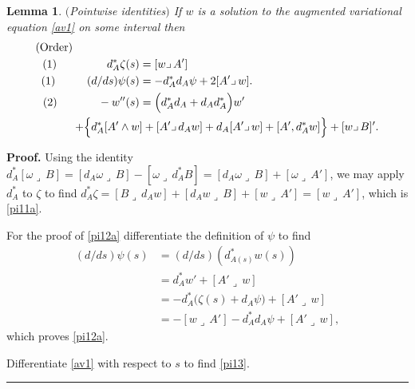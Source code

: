 \documentclass[12pt]{article}
\newtheorem{lemma}[theorem]{Lemma}
\newenvironment{proof}[1][Proof]{\textbf{#1.} }{\ \rule{0.5em}{0.5em}}
\def \({\Big(}
\def \){\Big)}
\def \w{\omega}
\def \eref{\eqref}
\def \lrc{\lrcorner\,}
\numberwithin{equation}{section}
\begin{document}
 \begin{lemma}\label{lempi2} $($Pointwise identities$)$  
  If $w$ is a solution to the augmented variational  equation  \eref{av1} on some interval then
  \begin{align}
  \text{$($Order$)$}\qquad \qquad \qquad  &       \notag\\
 (1)\qquad\ \ \ \ \ \ \  \, d_A^* \zeta(s) &= [ w\lrc A']                                                         \label{pi11a} \\ 
 (1) \qquad \ \ \,   (d/ds) \psi(s) &= - d_A^*d_A \psi + 2 [A'\lrc w].   \label{pi12a} \\                                                                                                       
 (2) \qquad\ \ \ \  \  -w''(s) &= \Big(d_A^* d_A + d_A d_A^*\Big) w'   \label{pi13}\\
+\Big\{ d_A^*[A' \wedge w&] + [ A' \lrc d_A w]  + d_A [A' \lrc w] + [A', d_A^* w] \Big\} 
                                              + [w\lrc B]'  .   \notag
\end{align}
\end{lemma}
 \begin{proof} 
 Using the identity 
 $d_A^*[\w \lrc B] = [ d_A \w  \lrc B] - [\w \lrc d_A^* B] 
 =[ d_A \w  \lrc B] + [\w \lrc A']$,
we may apply $d_A^*$ to $\zeta$  to find 
$d_A^* \zeta = [B\lrc d_A w] + [ d_A w  \lrc B] + [w \lrc A'] = [w \lrc A']$, which is \eref{pi11a}.

For the proof of \eref{pi12a} differentiate the definition of $\psi$ to find
\begin{align*}
(d/ds) \psi(s) &= (d/ds) (d_{A(s)}^* w(s)) \\
 &= d_A^* w' + [A'\lrc w] \\
&=-d_A^*\(\zeta (s) + d_A \psi\)  + [A'\lrc w]\\
&= -[w\lrc A'] - d_A^* d_A \psi  + [A'\lrc w],
\end{align*}
which proves \eref{pi12a}.

Differentiate \eref{av1} 
 with respect to $s$  to find \eref{pi13}.
  \end{proof}
\end{document}
